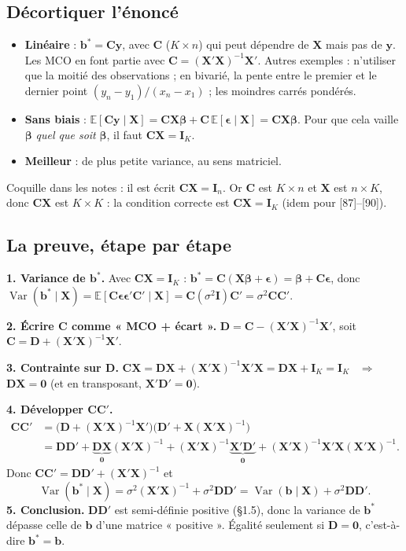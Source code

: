 \documentclass[11pt,a4paper]{article}
\newcommand{\vy}{\mathbf{y}}
\newcommand{\vX}{\mathbf{X}}
\newcommand{\vb}{\mathbf{b}}
\newcommand{\vbeta}{\bm{\beta}}
\newcommand{\veps}{\bm{\epsilon}}
\newcommand{\I}{\mathbf{I}}
\newcommand{\C}{\mathbf{C}}
\newcommand{\D}{\mathbf{D}}
\newcommand{\XtX}{\vX'\vX}
\newcommand{\XtXi}{(\vX'\vX)^{-1}}
\newcommand{\E}{\mathbb{E}}
\newcommand{\Var}{\operatorname{Var}}
\begin{document}
\subsection{Décortiquer l'énoncé}
\begin{itemize}
\item \textbf{Linéaire} : $\vb^*=\C\vy$, avec $\C$ ($K\times n$) qui peut dépendre de $\vX$ mais pas de $\vy$. Les MCO en font partie avec $\C=\XtXi\vX'$. Autres exemples : n'utiliser que la moitié des observations ; en bivarié, la pente entre le premier et le dernier point $(y_n-y_1)/(x_n-x_1)$ ; les moindres carrés pondérés.
\item \textbf{Sans biais} : $\E[\C\vy\mid\vX]=\C\vX\vbeta+\C\,\E[\veps\mid\vX]=\C\vX\vbeta$. Pour que cela vaille $\vbeta$ \emph{quel que soit} $\vbeta$, il faut $\C\vX=\I_K$.
\item \textbf{Meilleur} : de plus petite variance, au sens matriciel.
\end{itemize}

\begin{attention}
Coquille dans les notes : il est écrit $\C\vX=\I_n$. Or $\C$ est $K\times n$ et $\vX$ est $n\times K$, donc $\C\vX$ est $K\times K$ : la condition correcte est $\C\vX=\I_K$ (idem pour [87]--[90]).
\end{attention}

\subsection{La preuve, étape par étape}
\begin{detail}
\textbf{1. Variance de $\vb^*$.} Avec $\C\vX=\I_K$ : $\vb^*=\C(\vX\vbeta+\veps)=\vbeta+\C\veps$, donc
$\Var(\vb^*\mid\vX)=\E[\C\veps\veps'\C'\mid\vX]=\C(\sigma^2\I)\C'=\sigma^2\C\C'$.

\textbf{2. Écrire $\C$ comme « MCO + écart ».} $\D=\C-\XtXi\vX'$, soit $\C=\D+\XtXi\vX'$.

\textbf{3. Contrainte sur $\D$.} $\C\vX=\D\vX+\XtXi\XtX=\D\vX+\I_K=\I_K$ \ $\Rightarrow$ \ $\D\vX=\mathbf 0$ (et en transposant, $\vX'\D'=\mathbf 0$).

\textbf{4. Développer $\C\C'$.}
\[
\begin{aligned}
\C\C'&=\big(\D+\XtXi\vX'\big)\big(\D'+\vX\XtXi\big)\\
&=\D\D'+\underbrace{\D\vX}_{\mathbf 0}\XtXi+\XtXi\underbrace{\vX'\D'}_{\mathbf 0}+\XtXi\XtX\XtXi .
\end{aligned}
\]
Donc $\C\C'=\D\D'+\XtXi$ et
\[
\Var(\vb^*\mid\vX)=\sigma^2\XtXi+\sigma^2\D\D'=\Var(\vb\mid\vX)+\sigma^2\D\D' .
\]
\textbf{5. Conclusion.} $\D\D'$ est semi-définie positive (§1.5), donc la variance de $\vb^*$ dépasse celle de $\vb$ d'une matrice « positive ». Égalité seulement si $\D=\mathbf 0$, c'est-à-dire $\vb^*=\vb$.
\end{detail}
\end{document}
